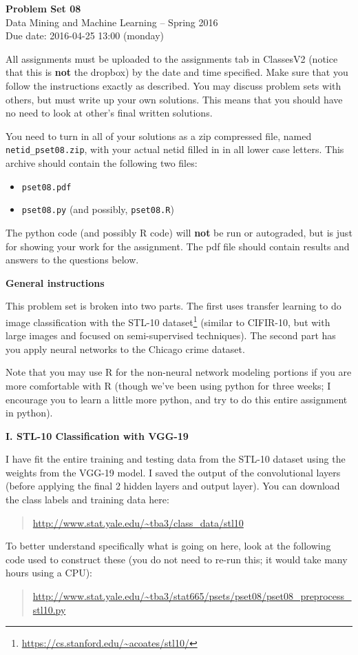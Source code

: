 \documentclass[12pt]{article}
\begin{document}
\begin{center}
{\bf Problem Set 08} \\
Data Mining and Machine Learning -- Spring 2016 \\
Due date: 2016-04-25 13:00 (monday)
\end{center}

\medskip

All assignments must be uploaded to the assignments tab in ClassesV2
(notice that this is \textbf{not} the dropbox) by the date and time specified.
Make sure that you follow the instructions exactly as described.
You may discuss problem sets with others, but must write up your own
solutions. This means that you should have no need to look at other's
final written solutions.

You need to turn in all of your solutions as a zip compressed file, named
\texttt{netid\_pset08.zip}, with your actual netid filled in in all lower
case letters. This archive should contain the following two files:
\begin{itemize}
\item \texttt{pset08.pdf}
\item \texttt{pset08.py} (and possibly, \texttt{pset08.R})
\end{itemize}
The python code (and possibly R code) will \textbf{not} be run or autograded,
but is just for showing your work for the assignment. The pdf file should
contain results and answers to the questions below.

\medskip

\textbf{General instructions}

This problem set is broken into two parts. The first uses transfer
learning to do image classification with the STL-10
dataset\footnote{\url{https://cs.stanford.edu/~acoates/stl10/}} (similar
to CIFIR-10, but with large images and focused on semi-supervised
techniques). The second part has you apply neural networks to the
Chicago crime dataset.

Note that you may use R for the non-neural network modeling portions
if you are more comfortable with R (though we've been using python
for three weeks; I encourage you to learn a little more python, and
try to do this entire assignment in python).

\textbf{I. STL-10 Classification with VGG-19}

I have fit the entire training and testing data from the STL-10 dataset
using the weights from the VGG-19 model. I saved the output of the
convolutional layers (before applying the final 2 hidden layers and
output layer). You can download the class labels and training data
here:
\begin{quote}
\url{http://www.stat.yale.edu/~tba3/class_data/stl10}
\end{quote}
To better understand specifically what is going on here, look at the
following code used to construct these (you do not need to re-run this;
it would take many hours using a CPU):
\begin{quote}
\url{http://www.stat.yale.edu/~tba3/stat665/psets/pset08/pset08_preprocess_stl10.py}
\end{quote}
\end{document}
